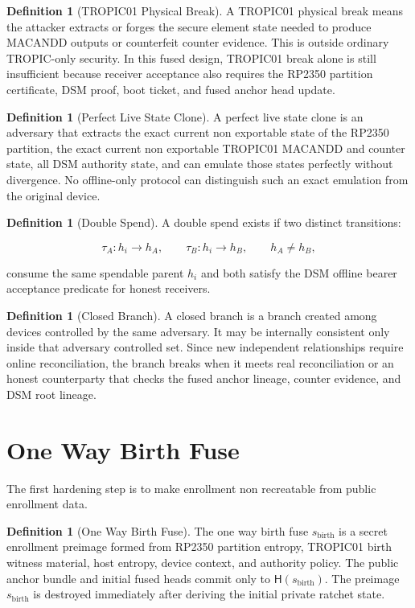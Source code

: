 \documentclass[11pt]{article}
\theoremstyle{definition}
\newtheorem{definition}[theorem]{Definition}
\theoremstyle{remark}
\newcommand{\Hf}{\ensuremath{\mathsf{H}}}
\begin{document}
\begin{definition}[TROPIC01 Physical Break]
A TROPIC01 physical break means the attacker extracts or forges the secure element state needed
to produce MACANDD outputs or counterfeit counter evidence. This is outside ordinary TROPIC-only
security. In this fused design, TROPIC01 break alone is still insufficient because receiver
acceptance also requires the RP2350 partition certificate, DSM proof, boot ticket, and fused anchor
head update.
\end{definition}

\begin{definition}[Perfect Live State Clone]
A perfect live state clone is an adversary that extracts the exact current non exportable state of
the RP2350 partition, the exact current non exportable TROPIC01 MACANDD and counter state, all
DSM authority state, and can emulate those states perfectly without divergence. No offline-only
protocol can distinguish such an exact emulation from the original device.
\end{definition}

\begin{definition}[Double Spend]
A double spend exists if two distinct transitions:

\[
\tau_A:h_i\rightarrow h_A,\qquad
\tau_B:h_i\rightarrow h_B,\qquad
h_A\neq h_B,
\]

consume the same spendable parent \(h_i\) and both satisfy the DSM offline bearer acceptance
predicate for honest receivers.
\end{definition}

\begin{definition}[Closed Branch]
A closed branch is a branch created among devices controlled by the same adversary. It may be
internally consistent only inside that adversary controlled set. Since new independent
relationships require online reconciliation, the branch breaks when it meets real reconciliation
or an honest counterparty that checks the fused anchor lineage, counter evidence, and DSM root
lineage.
\end{definition}

\section{One Way Birth Fuse}

The first hardening step is to make enrollment non recreatable from public enrollment data.

\begin{definition}[One Way Birth Fuse]
The one way birth fuse \(s_{\mathrm{birth}}\) is a secret enrollment preimage formed from RP2350
partition entropy, TROPIC01 birth witness material, host entropy, device context, and authority
policy. The public anchor bundle and initial fused heads commit only to \(\Hf(s_{\mathrm{birth}})\).
The preimage \(s_{\mathrm{birth}}\) is destroyed immediately after deriving the initial private
ratchet state.
\end{definition}
\end{document}
